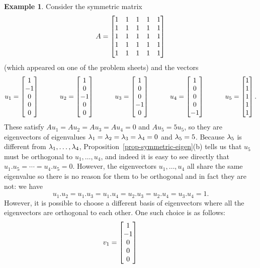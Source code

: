 \documentclass[reqno]{amsart}
\theoremstyle{definition}
\newtheorem{example}[theorem]{Example}
\begin{document}
\begin{example}\label{eg-orth-eigen-i}
 Consider the symmetric matrix
 \[ A = \left[\begin{matrix} 
     1&1&1&1&1 \\ 1&1&1&1&1 \\ 1&1&1&1&1 \\ 1&1&1&1&1 \\ 1&1&1&1&1 
    \end{matrix}\right]
 \]
 (which appeared on one of the problem sheets) and the vectors
 \[ u_1 = \left[\begin{matrix} 1\\-1\\ 0\\ 0\\ 0 \end{matrix}\right] \hspace{3em}
    u_2 = \left[\begin{matrix} 1\\ 0\\-1\\ 0\\ 0 \end{matrix}\right] \hspace{3em}
    u_3 = \left[\begin{matrix} 1\\ 0\\ 0\\-1\\ 0 \end{matrix}\right] \hspace{3em}
    u_4 = \left[\begin{matrix} 1\\ 0\\ 0\\ 0\\-1 \end{matrix}\right] \hspace{3em}
    u_5 = \left[\begin{matrix} 1\\ 1\\ 1\\ 1\\ 1 \end{matrix}\right].
 \]
 These satisfy $Au_1=Au_2=Au_3=Au_4=0$ and $Au_5=5u_5$, so they are
 eigenvectors of eigenvalues $\lambda_1=\lambda_2=\lambda_3=\lambda_4=0$ and
 $\lambda_5=5$.  Because $\lambda_5$ is different from
 $\lambda_1,\dotsc,\lambda_4$, Proposition~\ref{prop-symmetric-eigen}(b) tells
 us that $u_5$ must be orthogonal to $u_1,\dotsc,u_4$, and indeed it
 is easy to see directly that $u_1.u_5=\dotsb=u_4.u_5=0$.  However,
 the eigenvectors $u_1,\dotsc,u_4$ all share the same eigenvalue so
 there is no reason for them to be orthogonal and in fact they are
 not: we have
 \[ u_1.u_2=u_1.u_3=u_1.u_4=u_2.u_3=u_2.u_4=u_3.u_4=1. \]
 However, it is possible to choose a different basis of eigenvectors
 where all the eigenvectors are orthogonal to each other.  One such
 choice is as follows:
 \[ v_1 = \left[\begin{matrix}  1 \\ -1 \\  0 \\  0 \\  0 \end{matrix}\right] \hspace{3em}
\]
\end{example}
\end{document}
